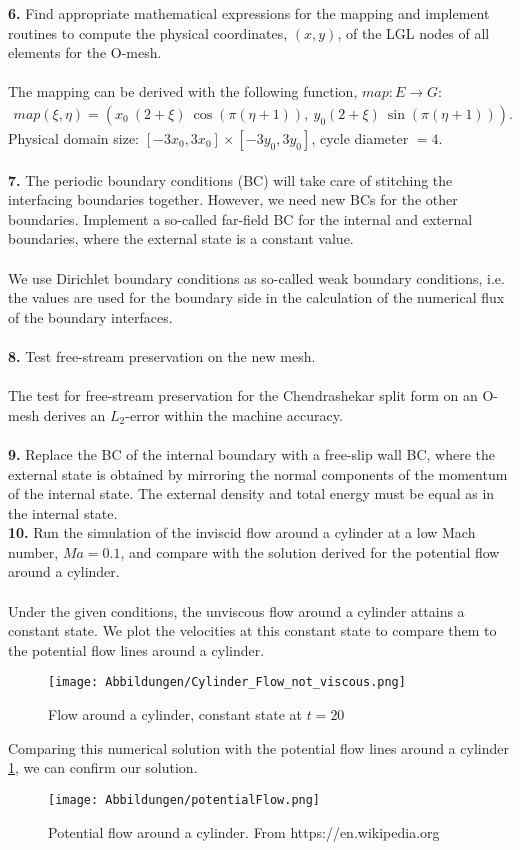 \documentclass[11pt]{scrartcl}
\begin{document}
\textbf{6.} Find appropriate mathematical expressions for the mapping and implement routines to compute the physical coordinates, $(x,y)$, of the LGL nodes of all elements for the O-mesh.\\ \ \\
The mapping can be derived with the following function, $map: E \rightarrow G$:
\begin{align*}
map(\xi, \eta) = \left( x_0 \ (2 + \xi )\  \cos(\pi (\eta + 1)), \ y_0 (2 + \xi ) \ \sin(\pi (\eta + 1)) \right).
\end{align*}
Physical domain size: $[-3x_0, 3x_0] \times [-3y_0, 3y_0] $, cycle diameter $= 4$.\\ \ \\
\textbf{7.} The periodic boundary conditions (BC) will take care of stitching the interfacing boundaries together. However, we need new BCs for the other boundaries. Implement a so-called far-field BC for the internal and external boundaries, where the external state is a constant value. \\ \ \\
We use Dirichlet boundary conditions as so-called weak boundary conditions, i.e. the values are used for the boundary side in the calculation of the numerical flux of the boundary interfaces. \\ \ \\
\textbf{8.} Test free-stream preservation on the new mesh.\\ \ \\
The test for free-stream preservation for the Chendrashekar split form on an O-mesh derives an $L_2$-error within the machine accuracy. \\ \ \\
\textbf{9.} Replace the BC of the internal boundary with a free-slip wall BC, where the external state is obtained by mirroring the normal components of the momentum of the internal state. The external density and total energy must be equal as in the internal state. \\
\textbf{10.} Run the simulation of the inviscid flow around a cylinder at a low Mach number, $Ma=0.1$, and compare with the solution derived for the potential flow around a cylinder. \\ \ \\
Under the given conditions, the unviscous flow around a cylinder attains a constant state. We plot the velocities at this constant state to compare them to the potential flow lines around a cylinder.
\begin{figure}[H]
\texttt{[image: Abbildungen/Cylinder\_Flow\_not\_viscous.png]}
\caption{Flow around a cylinder, constant state at $t = 20 $}
\end{figure} 
Comparing this numerical solution with the potential flow lines around a cylinder \ref{potentialFlow}, we can confirm our solution. \\
\begin{figure}[H]
\centering
\texttt{[image: Abbildungen/potentialFlow.png]}
\label{potentialFlow}
\caption{Potential flow around a cylinder. From https://en.wikipedia.org}
\end{figure}
\end{document}
